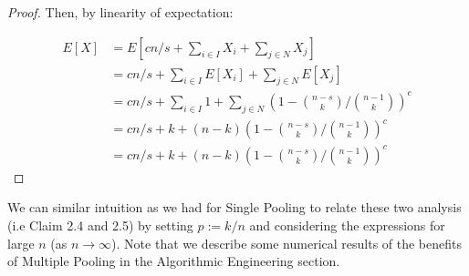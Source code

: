 \documentclass[12pt]{article}
\begin{document}
\begin{proof}
Then, by linearity of expectation:

\begin{align*}
E[X]&=E[cn/s + \sum\limits_{i \in I}^{}X_i + \sum\limits_{j \in N}^{}X_j] \\
    &= cn/s + \sum\limits_{i \in I}^{}E[X_i] + \sum\limits_{j \in N}^{}E[X_j] \\
    &= cn/s + \sum\limits_{i \in I}^{}{1} + \sum\limits_{j \in N}^{}{{(1-{n-s \choose k}/{n-1 \choose k})}^c} \\
    &= cn/s + k + (n-k){{(1-{n-s \choose k}/{n-1 \choose k})}^c} \\
    &= cn/s+k + (n-k){{(1-{n-s \choose k}/{n-1 \choose k})}^c}
\end{align*}     
 


\end{proof}


We can similar intuition as we had for Single Pooling to relate these two analysis (i.e Claim 2.4 and 2.5) by setting $p:=k/n$ and considering the expressions for large $n$ (as $n \to \infty$). Note that we describe some numerical results of the benefits of Multiple Pooling in the Algorithmic Engineering section. 
\end{document}
